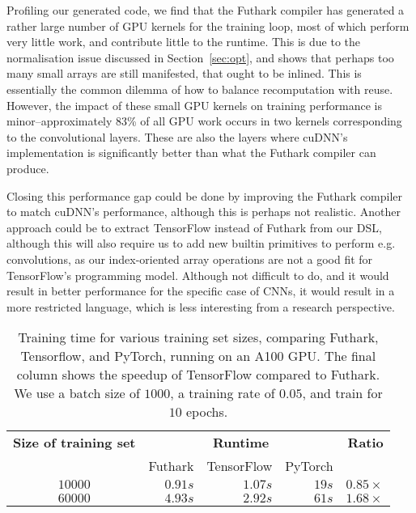 Profiling our generated code, we find that the Futhark compiler has
generated a rather large number of GPU kernels for the training loop,
most of which perform very little work, and contribute little to the
runtime. This is due to the normalisation issue discussed in
Section~\ref{sec:opt}, and shows that perhaps too many small arrays
are still manifested, that ought to be inlined. This is essentially
the common dilemma of how to balance recomputation with reuse.
However, the impact of these small GPU kernels on training performance
is minor--approximately 83\% of all GPU work occurs in two kernels
corresponding to the convolutional layers. These are also the layers
where cuDNN's implementation is significantly better than what the
Futhark compiler can produce.

Closing this performance gap could be done by improving the Futhark
compiler to match cuDNN's performance, although this is perhaps not
realistic. Another approach could be to extract TensorFlow instead of
Futhark from our DSL, although this will also require us to add new
builtin primitives to perform e.g. convolutions, as our index-oriented
array operations are not a good fit for TensorFlow's programming
model. Although not difficult to do, and it would result in better
performance for the specific case of CNNs, it would result in a more
restricted language, which is less interesting from a research
perspective.

\begin{table}
\begin{tabular}{crrrr}
\textbf{Size of training set} & \multicolumn{3}{c}{\textbf{Runtime}} & \textbf{Ratio} \\
& Futhark & TensorFlow & PyTorch & \\
$10000$ & $0.91s$ & $1.07s$ & $19s$ & $0.85\times{}$ \\
$60000$ & $4.93s$ & $2.92s$ & $61s$ & $1.68\times{}$
\end{tabular}
\caption{Training time for various training set sizes, comparing
  Futhark, Tensorflow, and PyTorch, running on an A100 GPU. The final column
  shows the speedup of TensorFlow compared to Futhark. We use a batch
  size of $1000$, a training rate of $0.05$, and train for $10$
  epochs.}
\label{tab:performance}
\end{table}

%
